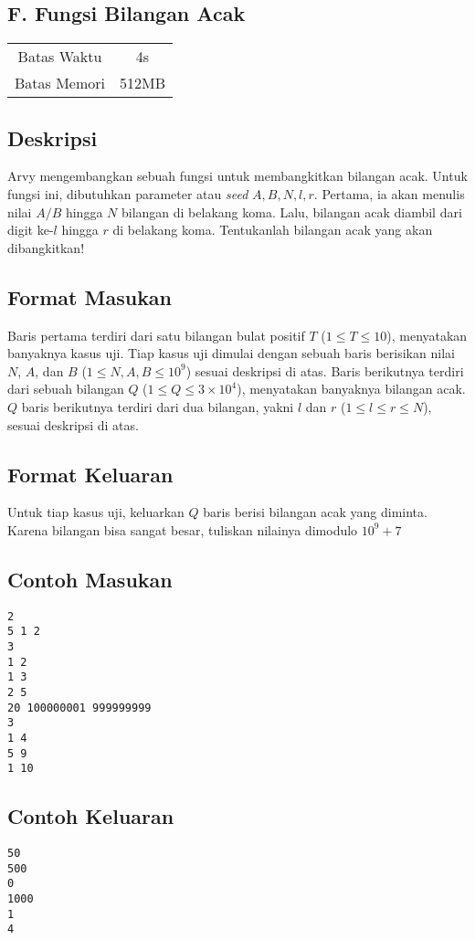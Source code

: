 \documentclass{article}
\begin{document}
\begin{center}
    \section*{F. Fungsi Bilangan Acak}

    \begin{tabular}{ | c c | }
        \hline
        Batas Waktu  & 4s \\
        Batas Memori & 512MB \\
        \hline
    \end{tabular}
\end{center}

\subsection*{Deskripsi}

Arvy mengembangkan sebuah fungsi untuk membangkitkan bilangan acak.
Untuk fungsi ini, dibutuhkan parameter atau \textit{seed} $A, B, N, l, r$.
Pertama, ia akan menulis nilai $A / B$ hingga $N$ bilangan di belakang koma.
Lalu, bilangan acak diambil dari digit ke-$l$ hingga $r$ di belakang koma.
Tentukanlah bilangan acak yang akan dibangkitkan!

\subsection*{Format Masukan}
Baris pertama terdiri dari satu bilangan bulat positif $T$ ($1 \leq T \leq 10$), menyatakan banyaknya kasus uji.
Tiap kasus uji dimulai dengan sebuah baris berisikan nilai $N$, $A$, dan $B$ ($1 \leq N, A, B \leq 10^{9}$) sesuai deskripsi di atas.
Baris berikutnya terdiri dari sebuah bilangan $Q$ ($1 \leq Q \leq 3 \times 10^{4}$), menyatakan banyaknya bilangan acak.
$Q$ baris berikutnya terdiri dari dua bilangan, yakni $l$ dan $r$ ($1 \leq l \leq r \leq N$), sesuai deskripsi di atas.

\subsection*{Format Keluaran}
Untuk tiap kasus uji, keluarkan $Q$ baris berisi bilangan acak yang diminta. Karena bilangan bisa sangat besar, tuliskan nilainya dimodulo $10^{9}+7$

\begin{multicols}{2}
\subsection*{Contoh Masukan}
\begin{lstlisting}
2
5 1 2
3
1 2
1 3
2 5
20 100000001 999999999
3
1 4
5 9
1 10
\end{lstlisting}
\columnbreak
\subsection*{Contoh Keluaran}
\begin{lstlisting}
50
500
0
1000
1
4
\end{lstlisting}
\vfill
\null
\end{multicols}
\end{document}
